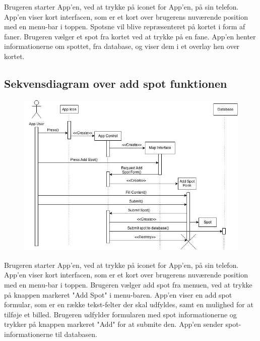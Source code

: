 \documentclass[12pt]{article}
\begin{document}
Brugeren starter App'en, ved at trykke på iconet for App'en, på sin telefon. App'en viser kort interfacen, 
som er et kort over brugerens nuværende position med en menu-bar i toppen. Spotsne vil blive repræsenteret 
på kortet i form af faner. Brugeren vælger et spot fra kortet ved at trykke på en fane. App'en henter
informationerne om spottet, fra database, og viser dem i et overlay hen over kortet.
\newpage

\subsection*{Sekvensdiagram over add spot funktionen}
\begin{figure}[h]
\includegraphics[scale = 0.5]{sekdia2}
\end{figure}

Brugeren starter App'en, ved at trykke på iconet for App'en, på sin telefon. App'en viser kort interfacen, 
som er et kort over brugerens nuværende position med en menu-bar i toppen. Brugeren vælger add spot fra menuen, 
ved at trykke på knappen markeret "Add Spot" i menu-baren. App'en viser en add spot formular, som er en række 
tekst-felter der skal udfyldes, samt en mulighed for at tilføje et billed. Brugeren udfylder formularen med spot 
informationerne og trykker på knappen markeret "Add" for at submite den. App'en sender spot-informationerne til databasen.

\newpage
\end{document}
